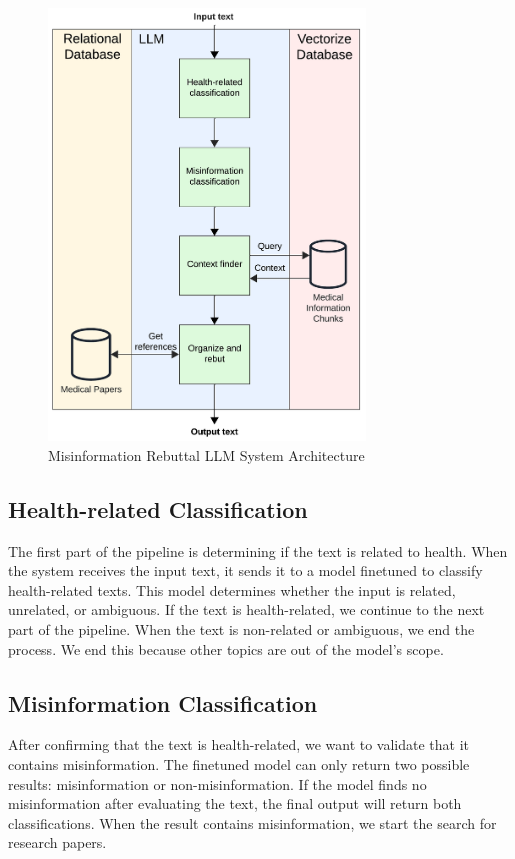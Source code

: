 \begin{figure}[H]
	\begin{center}
		\includegraphics[width=0.75\textwidth]{images/LLM_Pipeline} %
	\end{center}
	\caption{Misinformation Rebuttal LLM System Architecture} %
	\label{fig:llm}
\end{figure}


\subsection{Health-related Classification}
The first part of the pipeline is determining if the text is related to health. When the system receives the input text, it sends it to a model finetuned to classify health-related texts. This model determines whether the input is related, unrelated, or ambiguous.
If the text is health-related, we continue to the next part of the pipeline. When the text is non-related or ambiguous, we end the process. We end this because other topics are out of the model's scope. 

\subsection{Misinformation Classification}
After confirming that the text is health-related, we want to validate that it contains misinformation. The finetuned model can only return two possible results: misinformation or non-misinformation. If the model finds no misinformation after evaluating the text,
the final output will return both classifications. When the result contains misinformation, we start the search for research papers.

